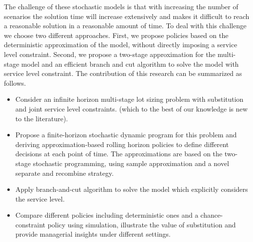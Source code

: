 \documentclass[10pt]{article}
\begin{document}
The challenge of these stochastic models is that with increasing the number of scenarios the solution time will increase extensively and makes it difficult to reach a reasonable solution in a reasonable amount of time. To deal with this challenge we choose two different approaches. First, we propose policies based on the deterministic approximation of the model, without directly imposing a service level constraint. Second, we propose a two-stage approximation for the multi-stage model and an efficient branch and cut algorithm to solve the model with service level constraint. 
The contribution of this research can be summarized as follows. 
\begin{itemize}
\item Consider an infinite horizon multi-stage lot sizing problem with substitution and joint service level constraints. (which to the best of our knowledge is new to the literature).

\item Propose a finite-horizon stochastic dynamic program for this problem and deriving approximation-based rolling horizon policies to define different decisions at each point of time. The approximations are based on the two-stage stochastic programming, using sample approximation and a novel separate and recombine strategy. 

\item Apply branch-and-cut algorithm to solve the model which explicitly considers the service level.

\item Compare different policies including deterministic ones and a chance-constraint policy using simulation, illustrate the value of substitution and provide managerial insights under different settings.%
    


\end{itemize}
\end{document}

